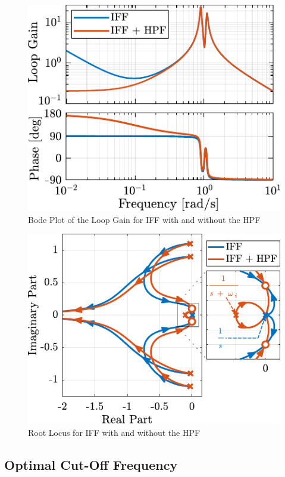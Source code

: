 \documentclass{ISMA_USD2020}
\begin{document}
\begin{figure}[htbp]
\centering
\includegraphics[scale=1]{figs/loop_gain_modified_iff.pdf}
\caption{\label{fig:loop_gain_modified_iff}Bode Plot of the Loop Gain for IFF with and without the HPF}
\end{figure}

\begin{figure}[htbp]
\centering
\includegraphics[scale=1]{figs/root_locus_modified_iff.pdf}
\caption{\label{fig:root_locus_modified_iff}Root Locus for IFF with and without the HPF}
\end{figure}

\subsection{Optimal Cut-Off Frequency}
\label{sec:orgd5828e4}
\end{document}
